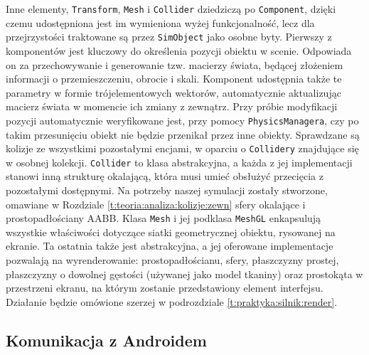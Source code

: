 		Inne elementy, \texttt{Transform}, \texttt{Mesh} i \texttt{Collider} dziedziczą po \texttt{Component}, dzięki czemu udostępniona jest im wymieniona wyżej funkcjonalność, lecz dla przejrzystości traktowane są przez \texttt{SimObject} jako osobne byty. Pierwszy z komponentów jest kluczowy do określenia pozycji obiektu w scenie. Odpowiada on za przechowywanie i generowanie tzw. macierzy świata, będącej złożeniem informacji o przemieszczeniu, obrocie i skali. Komponent udostępnia także te parametry w formie trójelementowych wektorów, automatycznie aktualizując macierz świata w momencie ich zmiany z zewnątrz. Przy próbie modyfikacji pozycji automatycznie weryfikowane jest, przy pomocy \texttt{PhysicsManagera}, czy po takim przesunięciu obiekt nie będzie przenikał przez inne obiekty. Sprawdzane są kolizje ze wszystkimi pozostałymi encjami, w oparciu o \texttt{Collidery} znajdujące się w osobnej kolekcji. \texttt{Collider} to klasa abstrakcyjna, a każda z jej implementacji stanowi inną strukturę okalającą, która musi umieć obsłużyć przecięcia z pozostałymi dostępnymi. Na potrzeby naszej symulacji zostały stworzone, omawiane w Rozdziale \ref{t:teoria:analiza:kolizje:zewn} sfery okalające i prostopadłościany AABB. Klasa \texttt{Mesh} i jej podklasa \texttt{MeshGL} enkapsulują wszystkie właściwości dotyczące siatki geometrycznej obiektu, rysowanej na ekranie. Ta ostatnia także jest abstrakcyjna, a jej oferowane implementacje pozwalają na wyrenderowanie: prostopadłościanu, sfery, płaszczyzny prostej, płaszczyzny o dowolnej gęstości (używanej jako model tkaniny) oraz prostokąta w przestrzeni ekranu, na którym zostanie przedstawiony element interfejsu. Działanie będzie omówione szerzej w podrozdziale \ref{t:praktyka:silnik:render}.
		
		\subsection{Komunikacja z Androidem}
		\label{t:praktyka:silnik:andro}
		
		
